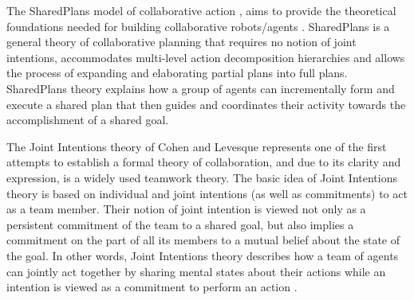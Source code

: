 \documentclass[a4paper, 11pt]{article}
\begin{document}
\begin{small}
The SharedPlans model of collaborative action \cite{grosz:planning-acting,
grosz:collaboration, grosz:plans-discourse}, aims to provide the theoretical
foundations needed for building collaborative robots/agents
\cite{grosz:collaborative-systems}. SharedPlans is a general theory of
collaborative planning that requires no notion of joint intentions, accommodates
multi-level action decomposition hierarchies and allows the process of expanding
and elaborating partial plans into full plans. SharedPlans theory explains how a
group of agents can incrementally form and execute a shared plan that then
guides and coordinates their activity towards the accomplishment of a shared
goal.


The Joint Intentions theory of Cohen and Levesque \cite{cohen:teamwork,
cohen:intention-commitment, cohen:persistence-intention-commitment,
cohen:intentions, levesque:acting-together} represents one of the first attempts
to establish a formal theory of collaboration, and due to its clarity and
expression, is a widely used teamwork theory. The basic idea of Joint Intentions
theory is based on individual and joint intentions (as well as commitments) to
act as a team member. Their notion of joint intention is viewed not only as a
persistent commitment of the team to a shared goal, but also implies a
commitment on the part of all its members to a mutual belief about the state of
the goal. In other words, Joint Intentions theory describes how a team of agents
can jointly act together by sharing mental states about their actions while an
intention is viewed as a commitment to perform an action 
\cite{cohen:intention-commitment}.


\end{small}
\end{document}
